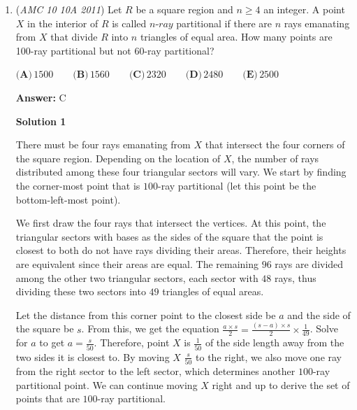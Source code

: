 \begin{enumerate}
 



\textbf{Solution 3}

Notice that the intersection of the tetrahedra is one of the larger tetrahedra with the four smaller tetrahedra on its points cut off. Using the tetrahedron volume formula ($\frac{\text{x}^3}{6\sqrt2}$, where $\text{x}$ is the length of a side), and using $\sqrt2$ and $\frac{\sqrt2}{2}$ as the side lengths, you get the volume of the intersection as $\frac{1}{3}-4\times\frac{1}{24}=\frac{1}{3}-\frac{1}{6}=\frac{1}{6}=\boxed{\text{(D)}}$.

 


 


	\item (\textit{AMC 10 10A 2011}) Let $R$ be a square region and $n\ge4$ an integer.  A point $X$ in the interior of $R$ is called $n\text{-}ray$ partitional if there are $n$ rays emanating from $X$ that divide $R$ into $n$ triangles of equal area.  How many points are 100-ray partitional but not 60-ray partitional?


 $\textbf{(A)}\,1500 \qquad\textbf{(B)}\,1560 \qquad\textbf{(C)}\,2320 \qquad\textbf{(D)}\,2480 \qquad\textbf{(E)}\,2500$

 \textbf{Answer: }C



\textbf{Solution 1}

There must be four rays emanating from $X$ that intersect the four corners of the square region. Depending on the location of $X$, the number of rays distributed among these four triangular sectors will vary. We start by finding the corner-most point that is $100$-ray partitional (let this point be the bottom-left-most point). 

 We first draw the four rays that intersect the vertices. At this point, the triangular sectors with bases as the sides of the square that the point is closest to both do not have rays dividing their areas. Therefore, their heights are equivalent since their areas are equal. The remaining $96$ rays are divided among the other two triangular sectors, each sector with $48$ rays, thus dividing these two sectors into $49$ triangles of equal areas. 

 Let the distance from this corner point to the closest side be $a$ and the side of the square be $s$. From this, we get the equation $\frac{a\times s}{2}=\frac{(s-a)\times s}{2}\times\frac1{49}$. Solve for $a$ to get $a=\frac s{50}$. Therefore, point $X$ is $\frac1{50}$ of the side length away from the two sides it is closest to. By moving $X$ $\frac s{50}$ to the right, we also move one ray from the right sector to the left sector, which determines another $100$-ray partitional point. We can continue moving $X$ right and up to derive the set of points that are $100$-ray partitional. 


\end{enumerate}
